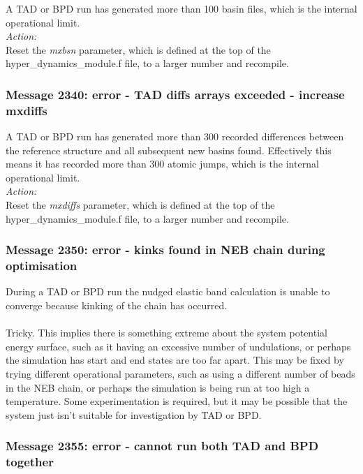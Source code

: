A TAD or BPD run has generated more than 100 basin files, which is the
internal operational limit.\\

\noindent
{\em Action:}\\ Reset the {\em mxbsn} parameter, which is defined at
the top of the hyper\_dynamics\_module.f file, to a larger number and
recompile.

\subsubsection*{Message 2340: error - TAD diffs arrays exceeded -
increase mxdiffs}

A TAD or BPD run has generated more than 300 recorded differences
between the reference structure and all subsequent new basins
found. Effectively this means it has recorded more than 300 atomic
jumps, which is the internal operational limit.\\

\noindent
{\em Action:}\\ Reset the {\em mxdiffs} parameter, which is defined at
the top of the hyper\_dynamics\_module.f file, to a larger number and
recompile.

\subsubsection*{Message 2350: error - kinks found in NEB chain 
during optimisation}

During a TAD or BPD run the nudged elastic band calculation is unable to
converge because kinking of the chain has occurred. \\

\\ Tricky. This implies there is something extreme
about the system potential energy surface, such as it having an excessive
number of undulations, or perhaps the simulation has start and end states are
too far apart. This may be fixed by trying different operational parameters,
such as using a different number of beads in the NEB chain, or perhaps the
simulation is being run at too high a temperature. Some experimentation is
required, but it may be possible that the system just isn't suitable for
investigation by TAD or BPD.

\subsubsection*{Message 2355: error - cannot run both TAD and BPD together}

